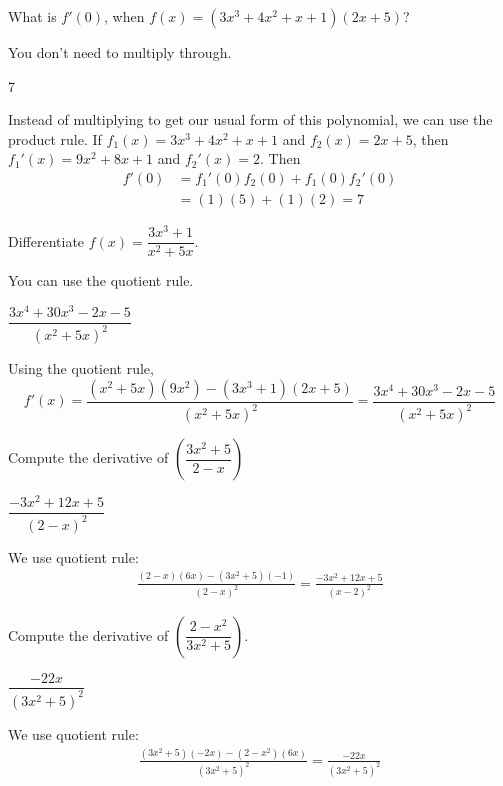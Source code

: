 \begin{question} What is $f'(0)$, when $f(x)=(3x^3+4x^2+x+1)(2x+5)$?
\end{question}
\begin{hint} You don't need to multiply through.
\end{hint}
\begin{answer} 7
\end{answer}
\begin{solution} Instead of multiplying to get our usual form of this polynomial, we can use the product rule. If $f_1(x)=3x^3+4x^2+x+1$ and $f_2(x)=2x+5$, then\\ $f_1'(x)=9x^2+8x+1$ and $f_2'(x)=2$. Then
\begin{align*}
f'(0)&=f_1'(0)f_2(0)+f_1(0)f_2'(0)\\
&=(1)(5)+(1)(2)=7\end{align*}
\end{solution}


\begin{question} Differentiate $f(x)=\dfrac{3x^3+1}{x^2+5x}$.
\end{question}
\begin{hint} You can use the quotient rule.
\end{hint}
\begin{answer} $\dfrac{3x^4+30x^3-2x-5}{(x^2+5x)^2}
$
\end{answer}
\begin{solution} Using the quotient rule,
\[f'(x) = \frac{(x^2+5x)(9x^2)-(3x^3+1)(2x+5)}{(x^2+5x)^2}
= \frac{3x^4+30x^3-2x-5}{(x^2+5x)^2}
\]\end{solution}


\begin{question} [2015Q]
Compute the derivative of $\left(\dfrac{3x^2+5}{2-x}\right)$
\end{question}
\begin{answer} $\dfrac{-3x^2+12x+5}{(2-x)^2}$
\end{answer}
\begin{solution}
We use quotient rule:
\begin{align*}
\frac{(2-x)(6x)-(3x^2+5)(-1)}{(2-x)^2}=\frac{-3x^2+12x+5}{(x-2)^2}
\end{align*}
\end{solution}


\begin{question}[2015Q]
Compute the derivative of $\left(\dfrac{2-x^2}{3x^2+5}\right)$.
\end{question}
\begin{answer} $\dfrac{-22x}{(3x^2+5)^2}$
\end{answer}
\begin{solution}
We use quotient rule:
\begin{align*}
\frac{(3x^2+5)(-2x) - (2-x^2)(6x)}{(3x^2+5)^2}=\frac{-22x}{(3x^2+5)^2}
\end{align*}
\end{solution}



